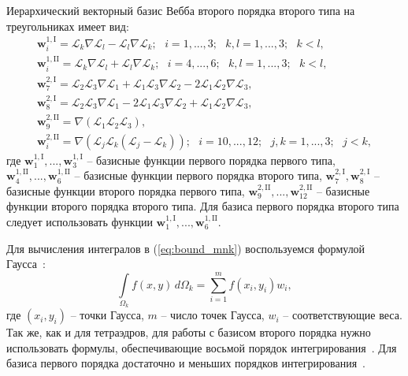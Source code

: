 \documentclass[a4paper,14pt]{article}
\begin{document}
Иерархический векторный базис Вебба второго порядка второго типа на треугольниках имеет вид:
\begin{equation*}
	\begin{matrix}
		\displaystyle
		\mathbf{w}_{i}^{1,\mathrm{I}} = \mathcal{L}_k \nabla \mathcal{L}_l - \mathcal{L}_l \nabla \mathcal{L}_k ;
		\scriptstyle
		\text{~~} i = 1, ..., 3 ; \text{~~} k, l = 1, ..., 3 ; \text{~~} k < l ,\\
		\displaystyle
		\mathbf{w}_{i}^{1,\mathrm{II}} = \mathcal{L}_k \nabla \mathcal{L}_l + \mathcal{L}_l \nabla \mathcal{L}_k ;
		\scriptstyle
		\text{~~} i = 4, ..., 6 ; \text{~~} k, l = 1, ..., 3 ; \text{~~} k < l ,\\
		\displaystyle
		\mathbf{w}_{7}^{2,\mathrm{I}} = \mathcal{L}_2 \mathcal{L}_3 \nabla \mathcal{L}_1 + \mathcal{L}_1 \mathcal{L}_3 \nabla \mathcal{L}_2 - 2 \mathcal{L}_1 \mathcal{L}_2 \nabla \mathcal{L}_3 ,\\
		\displaystyle
		\mathbf{w}_{8}^{2,\mathrm{I}} = \mathcal{L}_2 \mathcal{L}_3 \nabla \mathcal{L}_1 - 2 \mathcal{L}_1 \mathcal{L}_3 \nabla \mathcal{L}_2 + \mathcal{L}_1 \mathcal{L}_2 \nabla \mathcal{L}_3 ,\\
		\displaystyle
		\mathbf{w}_{9}^{2,\mathrm{II}} = \nabla ( \mathcal{L}_1 \mathcal{L}_2 \mathcal{L}_3 ) ,\\
		\displaystyle
		\mathbf{w}_{i}^{2,\mathrm{II}} = \nabla ( \mathcal{L}_j \mathcal{L}_k ( \mathcal{L}_j - \mathcal{L}_k ) ) ;
		\scriptstyle
		\text{~~} i = 10, ..., 12 ; \text{~~} j, k = 1, ..., 3 ; \text{~~} j < k ,
	\end{matrix}
	\label{eq:tr_basis}
\end{equation*}
где $\mathbf{w}_{1}^{1,\mathrm{I}}, ..., \mathbf{w}_{3}^{1,\mathrm{I}}$ – базисные функции первого порядка первого типа, $\mathbf{w}_{4}^{1,\mathrm{II}}, ..., \mathbf{w}_{6}^{1,\mathrm{II}}$ – базисные функции первого порядка второго типа, $\mathbf{w}_{7}^{2,\mathrm{I}}, \mathbf{w}_{8}^{2,\mathrm{I}}$ – базисные функции второго порядка первого типа, $\mathbf{w}_{9}^{2,\mathrm{II}}, ..., \mathbf{w}_{12}^{2,\mathrm{II}}$ – базисные функции второго порядка второго типа. Для базиса первого порядка второго типа следует использовать функции $\mathbf{w}_{1}^{1,\mathrm{I}}, ..., \mathbf{w}_{6}^{1,\mathrm{II}}$.

Для вычисления интегралов в (\ref{eq:bound_mnk}) воспользуемся формулой Гаусса~\citep{misovskih}:
\begin{equation*}
	\int\limits_{\Omega_k} f(x, y) \,d\Omega_k = \sum\limits_{i = 1}^m f( x_i , y_i) w_i ,
\end{equation*}
где $(x_i , y_i)$ -- точки Гаусса, $m$ -- число точек Гаусса, $w_i$ -- соответствующие веса. Так же, как и для тетраэдров, для работы с базисом второго порядка нужно использовать формулы, обеспечивающие восьмой порядок интегрирования~\citep{zhang_integration}. Для базиса первого порядка достаточно и меньших порядков интегрирования~\citep{tr_integration, misovskih}.
\end{document}
